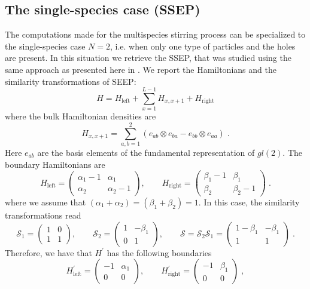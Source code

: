 \documentclass[10pt]{article}
\numberwithin{equation}{section}
\numberwithin{equation}{subsection}
\newcommand{\co}{\;,}
\newcommand{\dt}{\;.}
\begin{document}
\subsection{The single-species case (SSEP)}
The computations made for the multispecies stirring process can be specialized to the single-species case $N=2$, {\color{blue}i.e. when only one type of particles and the holes are present.} In this situation we retrieve the SSEP, that was studied using the same approach as presented here in \cite{frassek2020eigenstates}. We report the Hamiltonians and the similarity transformations of SEEP: 
\begin{equation}
	H=H_{\text{left}}+\sum_{x=1}^{L-1}H_{x,x+1}+H_{\text{right}}
\end{equation}
where the bulk Hamiltonian densities are 
\begin{equation}
	H_{x,x+1}=\sum_{a,b=1}^{2}\left(e_{ab}\otimes e_{ba}-e_{bb}\otimes e_{aa}\right)\dt
\end{equation}
Here $e_{ab}$ are the basis elements of the fundamental representation of $gl(2)$. The boundary Hamiltonians are
\begin{equation}
	H_{\text{left}}=\begin{pmatrix}
		\alpha_{1}-1&\alpha_{1}\\
		\alpha_{2}&\alpha_{2}-1
	\end{pmatrix},\qquad H_{\text{right}}=\begin{pmatrix}
	\beta_{1}-1&\beta_{1}\\
	\beta_{2}&\beta_{2}-1
\end{pmatrix}\dt
\end{equation} 
where we assume that $(\alpha_{1}+\alpha_{2})=(\beta_{1}+\beta_{2})=1$. In this case, the similarity transformations read
\begin{equation}
	\mathcal{S}_{1}=\begin{pmatrix}
		1&0\\
		1&1
	\end{pmatrix},\qquad \mathcal{S}_{2}=\begin{pmatrix}
	1&-\beta_{1}\\
	0&1
\end{pmatrix},\qquad \mathcal{S}=\mathcal{S}_{2}\mathcal{S}_{1}=\begin{pmatrix}
1-\beta_{1}&-\beta_{1}\\
1&1
\end{pmatrix}\dt
\end{equation}
Therefore, we have that $H^{'}$ has the following boundaries
\begin{equation}
	H^{'}_{\text{left}}=\begin{pmatrix}
		-1&\alpha_{1}\\
		0&0
	\end{pmatrix},\qquad H^{'}_{\text{right}}=\begin{pmatrix}
	-1&\beta_{1}\\
	0&0
\end{pmatrix}\co
\end{equation}
\end{document}
